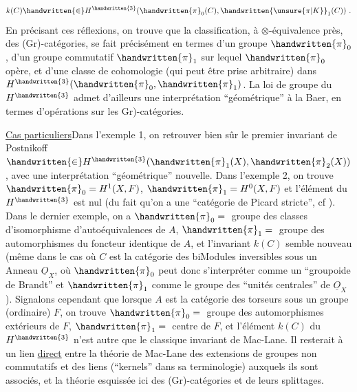 \[
k(C)\handwritten{\in}H^{\handwritten{3}}(\handwritten{\pi}_{0}(C),\handwritten{\unsure{\pi|K}}_{1}(C))\ .
\]
En précisant ces réflexions, on trouve que la classification, à $\otimes$-équivalence près, des (Gr)-catégories, se fait précisément en termes d'un groupe $\handwritten{\pi}_{0}$, d'un groupe commutatif $\handwritten{\pi}_{1}$ sur lequel $\handwritten{\pi}_{0}$ opère, et d'une classe de cohomologie (qui peut être prise arbitraire) dans $H^{\handwritten{3}}(\handwritten{\pi}_{0},\handwritten{\pi}_{1})$. La loi de  groupe du $H^{\handwritten{3}}$ admet d'ailleurs une interprétation ``géométrique'' à la Baer, en termes d'opérations sur les \handwritten{(}Gr)-catégories.

\uline{Cas particuliers}\quad Dans l'exemple 1, on  retrouver bien sûr le premier invariant de Postnikoff $\handwritten{\in}H^{\handwritten{3}}(\handwritten{\pi}_{1}(X),\handwritten{\pi}_{2}(X))$, avec une interprétation ``géo\deleted{\unsure{(}}métrique'' nouvelle. Dans l'exemple 2, on trouve $\handwritten{\pi}_{0}=H^{1}(X,F)$, $\handwritten{\pi}_{1}=H^{0}(X,F)$\handwritten{,} et l'élément du $H^{\handwritten{3}}$ est nul (du fait qu'on a une ``catégorie de Picard stricte'', cf \handwritten{[\, ]}). Dans  le dernier exemple, on a $\handwritten{\pi}_{0}={}$ groupe des classes d'isomorphisme d'autoéquivalences de $A$, $\handwritten{\pi}_{1}={}$ groupe des automorphismes du foncteur identique de $A$, et l'invariant $k(C)$ semble nouveau (même dans le cas où $C$ est la catégorie des biModules inversibles sous un Anneau $\underline{O}_{X}$, où $\handwritten{\pi}_{0}$ peut donc s'interpréter comme un ``groupoide de Brandt'' et $\handwritten{\pi}_{1}$ comme le groupe des ``unités centrales'' de $\underline{O}_{X}$). Signalons cependant que lorsque $A$ est la catégorie des torseurs sous un groupe (ordinaire) $F$, on trouve  $\handwritten{\pi}_{0}={}$ groupe des automorphismes extérieurs de $F$, $\handwritten{\pi}_{1}={}$ centre de $F$, et l'élément $k(C)$ du $H^{\handwritten{3}}$ n'est autre que le classique invariant de Mac-Lane. Il resterait à  un lien  \uline{direct} entre la théorie de Mac-Lane des extensions de groupes non commutatifs et des liens (``kernels''\deleted{\unsure{)|,}} dans sa terminologie) auxquels ils sont associés, et la théorie  esquissée ici des (Gr)-catégories et de leurs splittages.

